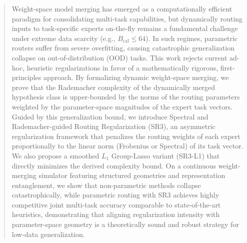 \begin{abstract}
Weight-space model merging has emerged as a computationally efficient paradigm for consolidating multi-task capabilities, but dynamically routing inputs to task-specific experts on-the-fly remains a fundamental challenge under extreme data scarcity (e.g., $B_{\text{cal}} \le 64$). In such regimes, parametric routers suffer from severe overfitting, causing catastrophic generalization collapse on out-of-distribution (OOD) tasks. This work rejects current ad-hoc, heuristic regularizations in favor of a mathematically rigorous, first-principles approach. By formalizing dynamic weight-space merging, we prove that the Rademacher complexity of the dynamically merged hypothesis class is upper-bounded by the norms of the routing parameters weighted by the parameter-space magnitudes of the expert task vectors. Guided by this generalization bound, we introduce Spectral and Rademacher-guided Routing Regularization (SR3), an asymmetric regularization framework that penalizes the routing weights of each expert proportionally to the linear norm (Frobenius or Spectral) of its task vector. We also propose a smoothed $L_1$ Group-Lasso variant (SR3-L1) that directly minimizes the derived complexity bound. On a continuous weight-merging simulator featuring structured geometries and representation entanglement, we show that non-parametric methods collapse catastrophically, while parametric routing with SR3 achieves highly competitive joint multi-task accuracy comparable to state-of-the-art heuristics, demonstrating that aligning regularization intensity with parameter-space geometry is a theoretically sound and robust strategy for low-data generalization.
\end{abstract}